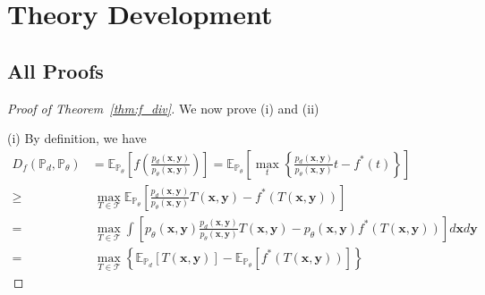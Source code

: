 

\section{Theory Development} \label{appendix:theory}
\subsection{All Proofs}
\begin{proof}[Proof of Theorem~\ref{thm:f_div}] We now prove (i) and (ii)

(i) By definition, we have
\begin{align*}
D_{f}\left(\mathbb{P}_{d},\mathbb{P}_{\theta}\right) & =\mathbb{E}_{\mathbb{P}_{\theta}}\left[f\left(\frac{p_{d}\left(\boldsymbol{x},\boldsymbol{y}\right)}{p_{\theta}\left(\boldsymbol{x},\boldsymbol{y}\right)}\right)\right]=\mathbb{E}_{\mathbb{P}_{\theta}}\left[\max_{t}\left\{ \frac{p_{d}\left(\boldsymbol{x},\boldsymbol{y}\right)}{p_{\theta}\left(\boldsymbol{x},\boldsymbol{y}\right)}t-f^{*}\left(t\right)\right\} \right]\\
\geq & \ \max_{T\in\mathcal{T}}\mathbb{E}_{\mathbb{P}_{\theta}}\left[\frac{p_{d}\left(\boldsymbol{x},\boldsymbol{y}\right)}{p_{\theta}\left(\boldsymbol{x},\boldsymbol{y}\right)}T\left(\boldsymbol{x},\boldsymbol{y}\right)-f^{*}\left(T\left(\boldsymbol{x},\boldsymbol{y}\right)\right)\right]\\
= & \ \max_{T\in\mathcal{T}}\int\left[p_{\theta}\left(\boldsymbol{x},\boldsymbol{y}\right)\frac{p_{d}\left(\boldsymbol{x},\boldsymbol{y}\right)}{p_{\theta}\left(\boldsymbol{x},\boldsymbol{y}\right)}T\left(\boldsymbol{x},\boldsymbol{y}\right)-p_{\theta}\left(\boldsymbol{x},\boldsymbol{y}\right)f^{*}\left(T\left(\boldsymbol{x},\boldsymbol{y}\right)\right)\right]d\boldsymbol{x}d\boldsymbol{y}\\
= & \ \max_{T\in\mathcal{T}}\left\{ \mathbb{E}_{\mathbb{P}_{d}}\left[T\left(\boldsymbol{x},\boldsymbol{y}\right)\right]-\mathbb{E}_{\mathbb{P}_{\theta}}\left[f^{*}\left(T\left(\boldsymbol{x},\boldsymbol{y}\right)\right)\right]\right\}
\end{align*}


\end{proof}
